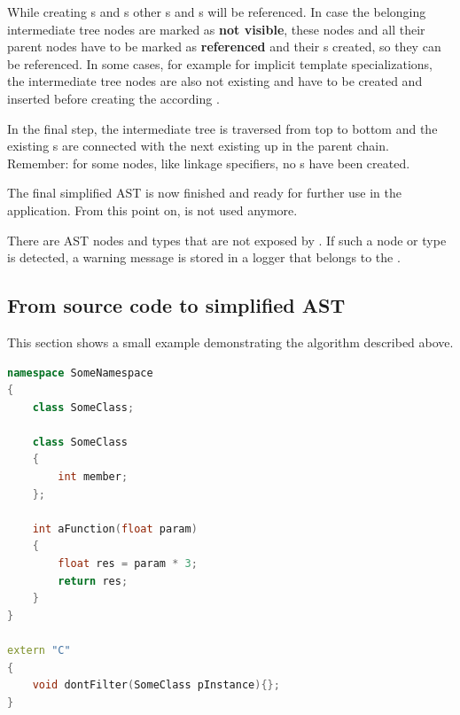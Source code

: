 While creating s and s other s and s will be referenced. In case the belonging intermediate tree nodes are marked as \textbf{not visible}, these nodes and all their parent nodes have to be marked as \textbf{referenced} and their s created, so they can be referenced. In some cases, for example for implicit template specializations, the intermediate tree nodes are also not existing and have to be created and inserted before creating the according .

In the final step, the intermediate tree is traversed from top to bottom and the existing s are connected with the next existing  up in the parent chain. Remember: for some nodes, like linkage specifiers, no s have been created.

The final simplified AST is now finished and ready for further use in the application. From this point on,  is not used anymore.

There are AST nodes and types that are not exposed by . If such a node or type is detected, a warning message is stored in a logger that belongs to the .

\newpage
\subsection{From source code to simplified AST}

This section shows a small example demonstrating the algorithm described above.

\SingleSpacing
\begin{lstlisting}[language=C++, caption=Example input code for \myProperName{CPPAnalyzer}]
namespace SomeNamespace
{
	class SomeClass;
	
	class SomeClass
	{
		int member;
	};
	
	int aFunction(float param)
	{
		float res = param * 3;
		return res;
	}
}

extern "C"
{
	void dontFilter(SomeClass pInstance){};
}
\end{lstlisting}
\OnehalfSpacing

